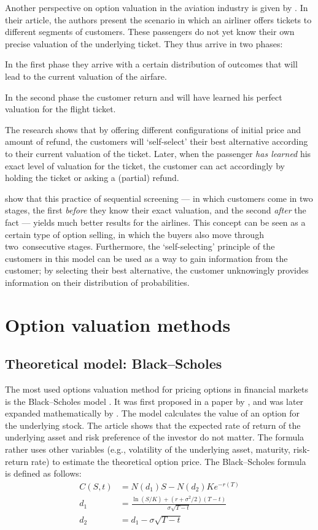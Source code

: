 Another perspective on option valuation in the aviation industry is given by . In their article, the authors present the scenario in which an airliner offers tickets to different segments of customers. These passengers do not yet know their own precise valuation of the underlying ticket. They thus arrive in two phases:
\begin{compactitem}
    \item In the first phase they arrive with a certain distribution of outcomes that will lead to the current valuation of the airfare.
    \item In the second phase the customer return and will have learned his perfect valuation for the flight ticket.
\end{compactitem}

The research shows that by offering different configurations of initial price and amount of refund, the customers will `self-select' their best alternative according to their current valuation of the ticket. Later, when the passenger \emph{has learned} his exact level of valuation for the ticket, the customer can act accordingly by holding the ticket or asking a (partial) refund.

 show that this practice of sequential screening --- in which customers come in two stages, the first \emph{before} they know their exact valuation, and the second \emph{after} the fact --- yields much better results for the airlines. This concept can be seen as a certain type of option selling, in which the buyers also move through two~consecutive stages. Furthermore, the `self-selecting' principle of the customers in this model can be used as a way to gain information from the customer; by selecting their best alternative, the customer unknowingly provides information on their distribution of probabilities.

\section{Option valuation methods}
\subsection{Theoretical model: Black--Scholes}
The most used options valuation method for pricing options in financial markets is the Black--Scholes model \cite{hull99}.  It was first proposed in a paper by , and was later expanded mathematically by . The model calculates the value of an option for the underlying stock. The article shows that the expected rate of return of the underlying asset and risk preference of the investor do not matter. The formula rather uses other variables (e.g., volatility of the underlying asset, maturity, risk-return rate) to estimate the theoretical option price. The Black--Scholes formula is defined as follows:
\begin{align*}
C(S, t) &= N(d_1)S - N(d_2) Ke^{-r(T)} \\
d_1 &= \frac{\ln(S/K) + (r + \sigma^2/2)(T - t)}{\sigma \sqrt{T - t}} \\
d_2 &= d_1 - \sigma \sqrt{T - t}
\end{align*}

